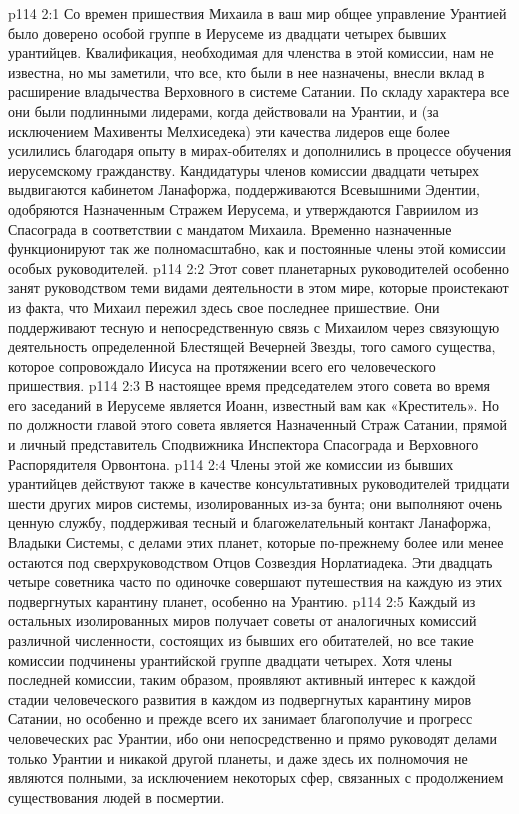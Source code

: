 \vs p114 2:1 Со времен пришествия Михаила в ваш мир общее управление Урантией было доверено особой группе в Иерусеме из двадцати четырех бывших урантийцев. Квалификация, необходимая для членства в этой комиссии, нам не известна, но мы заметили, что все, кто были в нее назначены, внесли вклад в расширение владычества Верховного в системе Сатании. По складу характера все они были подлинными лидерами, когда действовали на Урантии, и (за исключением Махивенты Мелхиседека) эти качества лидеров еще более усилились благодаря опыту в мирах\hyp{}обителях и дополнились в процессе обучения иерусемскому гражданству. Кандидатуры членов комиссии двадцати четырех выдвигаются кабинетом Ланафоржа, поддерживаются Всевышними Эдентии, одобряются Назначенным Стражем Иерусема, и утверждаются Гавриилом из Спасограда в соответствии с мандатом Михаила. Временно назначенные функционируют так же полномасштабно, как и постоянные члены этой комиссии особых руководителей.
\vs p114 2:2 Этот совет планетарных руководителей особенно занят руководством теми видами деятельности в этом мире, которые проистекают из факта, что Михаил пережил здесь свое последнее пришествие. Они поддерживают тесную и непосредственную связь с Михаилом через связующую деятельность определенной Блестящей Вечерней Звезды, того самого существа, которое сопровождало Иисуса на протяжении всего его человеческого пришествия.
\vs p114 2:3 В настоящее время председателем этого совета во время его заседаний в Иерусеме является Иоанн, известный вам как «Креститель». Но по должности главой этого совета является Назначенный Страж Сатании, прямой и личный представитель Сподвижника Инспектора Спасограда и Верховного Распорядителя Орвонтона.
\vs p114 2:4 Члены этой же комиссии из бывших урантийцев действуют также в качестве консультативных руководителей тридцати шести других миров системы, изолированных из\hyp{}за бунта; они выполняют очень ценную службу, поддерживая тесный и благожелательный контакт Ланафоржа, Владыки Системы, с делами этих планет, которые по\hyp{}прежнему более или менее остаются под сверхруководством Отцов Созвездия Норлатиадека. Эти двадцать четыре советника часто по одиночке совершают путешествия на каждую из этих подвергнутых карантину планет, особенно на Урантию.
\vs p114 2:5 Каждый из остальных изолированных миров получает советы от аналогичных комиссий различной численности, состоящих из бывших его обитателей, но все такие комиссии подчинены урантийской группе двадцати четырех. Хотя члены последней комиссии, таким образом, проявляют активный интерес к каждой стадии человеческого развития в каждом из подвергнутых карантину миров Сатании, но особенно и прежде всего их занимает благополучие и прогресс человеческих рас Урантии, ибо они непосредственно и прямо руководят делами только Урантии и никакой другой планеты, и даже здесь их полномочия не являются полными, за исключением некоторых сфер, связанных с продолжением существования людей в посмертии.
